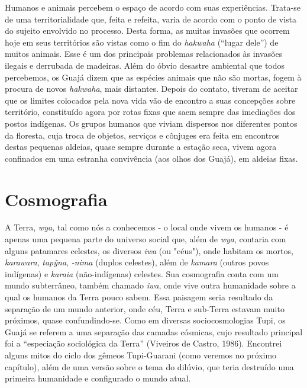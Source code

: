 Humanos e animais percebem o espaço de acordo com suas experiências.
Trata-se de uma territorialidade que, feita e refeita, varia de acordo
com o ponto de vista do sujeito envolvido no processo. Desta forma, as
muitas invasões que ocorrem hoje em seus territórios são vistas como o
fim do \emph{hakwaha} (``lugar dele'') de muitos animais. Esse é um dos
principais problemas relacionados às invasões ilegais e derrubada de
madeiras. Além do óbvio desastre ambiental que todos percebemos, os
Guajá dizem que as espécies animais que não são mortas, fogem à procura
de novos \emph{hakwaha}, mais distantes. Depois do contato, tiveram de
aceitar que os limites colocados pela nova vida vão de encontro a suas
concepções sobre território, constituído agora por rotas fixas que saem
sempre das imediações dos postos indígenas. Os grupos humanos que viviam
dispersos nos diferentes pontos da floresta, cuja troca de objetos,
serviços e cônjuges era feita em encontros destas pequenas aldeias,
quase sempre durante a estação seca, vivem agora confinados em uma
estranha convivência (aos olhos dos Guajá), em aldeias fixas.

\section{Cosmografia}\label{cosmografia}

A Terra, \emph{wya,} tal como nós a conhecemos - o local onde vivem os
humanos - é apenas uma pequena parte do universo social que, além de
\emph{wya}, contaria com alguns patamares celestes, os diversos
\emph{iwa} (ou "céus"), onde habitam os mortos, \emph{karawara},
\emph{tapỹna}, \emph{-nima} (duplos celestes), além de \emph{kamara}
(outros povos indígenas) e \emph{karaia} (não-indígenas) celestes. Sua
cosmografia conta com um mundo subterrâneo, também chamado \emph{iwa},
onde vive outra humanidade sobre a qual os humanos da Terra pouco sabem.
Essa paisagem seria resultado da separação de um mundo anterior, onde
céu, Terra e sub-Terra estavam muito próximos, quase confundindo-se.
Como em diversas sociocosmologias Tupi, os Guajá se referem a uma
separação das camadas cósmicas, cujo resultado principal foi a
``especiação sociológica da Terra'' (Viveiros de Castro, 1986).
Encontrei alguns mitos do ciclo dos gêmeos Tupi-Guarani (como veremos no
próximo capítulo), além de uma versão sobre o tema do dilúvio, que teria
destruído uma primeira humanidade e configurado o mundo atual.

